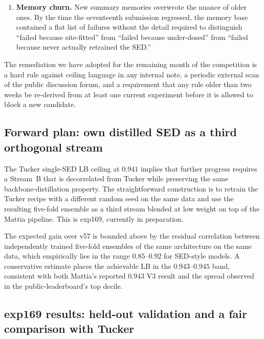 \begin{enumerate}
``v33 is the ceiling'' became a working hypothesis, every
regression was interpreted as confirmation, and the
$+0.002$/step harm-reduction trend across v46$\to$v47$\to$v48
(which was a clean monotonic improvement in a regression band)
was discarded as noise rather than read as gradient
information.
\item \textbf{Memory churn.} New summary memories overwrote the
nuance of older ones. By the time the seventeenth submission
regressed, the memory base contained a flat list of failures
without the detail required to distinguish ``failed because
site-fitted'' from ``failed because under-dosed'' from ``failed
because never actually retrained the SED.''
\end{enumerate}

The remediation we have adopted for the remaining month of the
competition is a hard rule against ceiling language in any
internal note, a periodic external scan of the public discussion
forum, and a requirement that any rule older than two weeks be
re-derived from at least one current experiment before it is
allowed to block a new candidate.


\subsection{Forward plan: own distilled SED as a third orthogonal stream}
\label{sec:exp169-plan}

The Tucker single-SED LB ceiling at $0.941$ implies that further
progress requires a Stream~B that is decorrelated from Tucker
while preserving the same backbone-distillation property. The
straightforward construction is to retrain the Tucker recipe with
a different random seed on the same data and use the resulting
five-fold ensemble as a third stream blended at low weight on top
of the Mattia pipeline. This is exp169, currently in preparation.

The expected gain over v57 is bounded above by the residual
correlation between independently trained five-fold ensembles of
the same architecture on the same data, which empirically lies
in the range $0.85$--$0.92$ for SED-style models. A conservative
estimate places the achievable LB in the $0.943$--$0.945$ band,
consistent with both Mattia's reported $0.943$ V3 result and the
spread observed in the public-leaderboard's top decile.


\subsection{exp169 results: held-out validation and a fair comparison with Tucker}
\label{sec:exp169-results}

